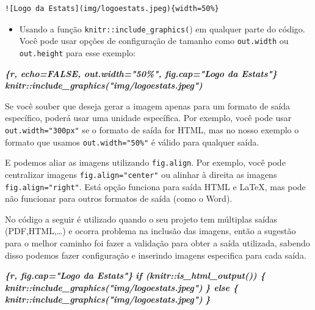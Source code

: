 \documentclass[
]{book}
\newenvironment{Shaded}{\begin{snugshade}}{\end{snugshade}}
\newcommand{\InformationTok}[1]{\textcolor[rgb]{0.56,0.35,0.01}{\textbf{\textit{#1}}}}
\providecommand{\tightlist}{%
  \setlength{\itemsep}{0pt}\setlength{\parskip}{0pt}}
\begin{document}
\begin{verbatim}
![Logo da Estats](img/logoestats.jpeg){width=50%}
\end{verbatim}

\begin{itemize}
\tightlist
\item
  Usando a função \texttt{knitr::include\_graphics(}) em qualquer parte do código. Você pode usar opções de configuração de tamanho como \texttt{out.width} ou \texttt{out.height} para esse exemplo:
\end{itemize}

\begin{Shaded}
\begin{Highlighting}[]
\InformationTok{\textasciigrave{}\textasciigrave{}\textasciigrave{}\{r, echo=FALSE, out.width="50\%", fig.cap="Logo da Estats"\}}
\InformationTok{knitr::include\_graphics("img/logoestats.jpeg")}
\InformationTok{\textasciigrave{}\textasciigrave{}\textasciigrave{}}
\end{Highlighting}
\end{Shaded}

Se você souber que deseja gerar a imagem apenas para um formato de saída específico, poderá usar uma unidade específica. Por exemplo, você pode usar \texttt{out.width="300px"} se o formato de saída for HTML, mas no nosso exemplo o formato que usamos \texttt{out.width="50\%"} é válido para qualquer saída.

E podemos aliar as imagens utilizando \texttt{fig.align}. Por exemplo, você pode centralizar imagens \texttt{fig.align="center"} ou alinhar à direita as imagens \texttt{fig.align="right\textquotesingle{}"}. Está opção funciona para saída HTML e LaTeX, mas pode não funcionar para outros formatos de saída (como o Word).

No código a seguir é utilizado quando o seu projeto tem múltiplas saídas (PDF,HTML,\ldots) e ocorra problema na inclusão das imagens, então a sugestão para o melhor caminho foi fazer a validação para obter a saída utilizada, sabendo disso podemos fazer configuração e inserindo imagens especifica para cada saída.

\begin{Shaded}
\begin{Highlighting}[]
\InformationTok{\textasciigrave{}\textasciigrave{}\textasciigrave{}\{r, fig.cap="Logo da Estats"\}}
\InformationTok{if (knitr::is\_html\_output()) \{}
\InformationTok{    knitr::include\_graphics("img/logoestats.jpeg")}
\InformationTok{\} else \{}
\InformationTok{    knitr::include\_graphics("img/logoestats.jpeg")}
\InformationTok{\}}
\InformationTok{\textasciigrave{}\textasciigrave{}\textasciigrave{}}
\end{Highlighting}
\end{Shaded}
\end{document}
